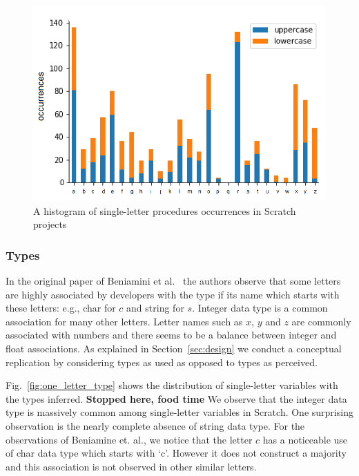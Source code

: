 \documentclass[conference]{IEEEtran}
\newcommand{\todo}[1]{ \textbf{#1} }
\begin{document}
\begin{figure}[h]
	\begin{center}
		\includegraphics[width=\columnwidth]{fig/funcname_singleletter-occurrences}
		\caption{A histogram of single-letter procedures occurrences in Scratch projects}
		\label{fig:one_letter_occurrence_procedures}
	\end{center}
\end{figure} 

\subsubsection{Types}
\label{res:types}
In the original paper of Beniamini et al.~\cite{Beniamini} the authors observe that some letters are highly associated by developers with the type if its name which starts with these letters: e.g., char for $c$ and string for $s$. 
Integer data type is a common association for many other letters.
Letter names such as $x$, $y$ and $z$ are commonly associated with numbers and there seems to be a balance between integer and float associations. 
As explained in Section~\ref{sec:design} we conduct a conceptual replication by considering types as used as opposed to types as perceived.


Fig.~\ref{fig:one_letter_type} shows the distribution of single-letter variables with the types inferred. \todo{Stopped here, food time}
We observe that the integer data type is massively common among single-letter variables in Scratch. One surprising observation is the nearly complete absence of string data type. For the observations of Beniamine et. al., we notice that the letter $c$ has a noticeable use of char data type which starts with `c'. However it does not construct a majority and this association is not observed in other similar letters. 
\end{document}
